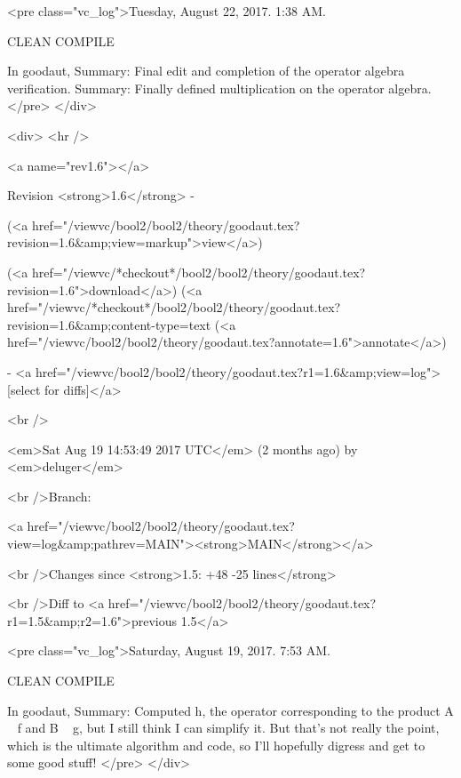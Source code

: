 <pre class="vc_log">Tuesday, August 22, 2017.  1:38 AM.

CLEAN COMPILE

In goodaut,
Summary: Final edit and completion of the operator algebra verification.
Summary: Finally defined multiplication on the operator algebra.
</pre>
</div>



<div>
<hr />

<a name="rev1.6"></a>


Revision <strong>1.6</strong> -


(<a href="/viewvc/bool2/bool2/theory/goodaut.tex?revision=1.6&amp;view=markup">view</a>)


(<a href="/viewvc/*checkout*/bool2/bool2/theory/goodaut.tex?revision=1.6">download</a>)
(<a href="/viewvc/*checkout*/bool2/bool2/theory/goodaut.tex?revision=1.6&amp;content-type=text%
(<a href="/viewvc/bool2/bool2/theory/goodaut.tex?annotate=1.6">annotate</a>)



- <a href="/viewvc/bool2/bool2/theory/goodaut.tex?r1=1.6&amp;view=log">[select for diffs]</a>




<br />

<em>Sat Aug 19 14:53:49 2017 UTC</em>
(2 months ago)
by <em>deluger</em>


<br />Branch:

<a href="/viewvc/bool2/bool2/theory/goodaut.tex?view=log&amp;pathrev=MAIN"><strong>MAIN</strong></a>







<br />Changes since <strong>1.5: +48 -25 lines</strong>








<br />Diff to <a href="/viewvc/bool2/bool2/theory/goodaut.tex?r1=1.5&amp;r2=1.6">previous 1.5</a>










<pre class="vc_log">Saturday, August 19, 2017.  7:53 AM.

CLEAN COMPILE

In goodaut,
Summary: Computed h, the operator corresponding to the product A ~ f and B ~ g,
but I still think I can
simplify it.  But that's not really the point, which is the ultimate algorithm
and code, so
I'll hopefully digress
and get to some good stuff!
</pre>
</div>



